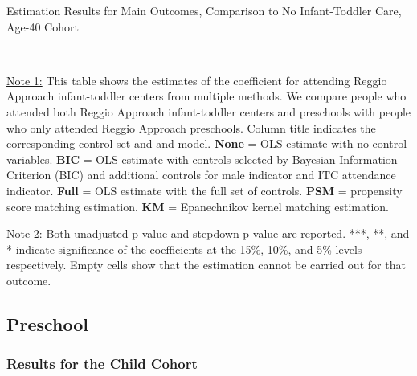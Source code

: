 \begin{table}[H] \caption{Estimation Results for Main Outcomes, Comparison to No Infant-Toddler Care, Age-40 Cohort} \label{ols-M-adult40-reg-nopres-asilo}
\scalebox{0.63}{}
\vspace{1ex} \\
\footnotesize\raggedright{\underline{Note 1:} This table shows the estimates of the coefficient for attending Reggio Approach infant-toddler centers from multiple methods. We compare people who attended both Reggio Approach infant-toddler centers and preschools with people who only attended Reggio Approach preschools. Column title indicates the corresponding control set and and model.  \textbf{None} = OLS estimate with no control variables. \textbf{BIC} = OLS estimate with controls selected by Bayesian Information Criterion (BIC) and additional controls for male indicator and ITC attendance indicator. \textbf{Full} = OLS estimate with the full set of controls. \textbf{PSM} =  propensity score matching estimation. \textbf{KM} =  Epanechnikov kernel matching estimation.}

\footnotesize\raggedright{\underline{Note 2:} Both unadjusted p-value and stepdown p-value are reported. ***, **, and * indicate significance of the coefficients at the 15\%, 10\%, and 5\% levels respectively. Empty cells show that the estimation cannot be carried out for that outcome.}
\end{table}

\subsection{Preschool}

\subsubsection{Results for the Child Cohort}

